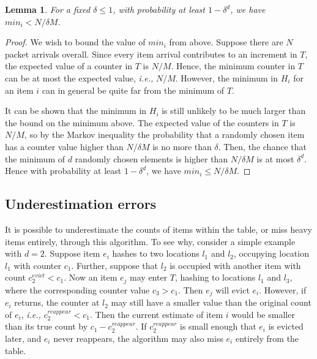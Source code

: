 \documentclass[10pt]{article}
\newtheorem{lemma}{Lemma}
\newcommand{\ie}{{\em i.e.,} }
\begin{document}
\begin{lemma}
For a fixed $\delta \leq 1$, with probability at least $1 - \delta^d$, we have
$min_i < N/\delta M$.
\end{lemma}

\begin{proof}

We wish to bound the value of $min_i$ from above. Suppose there are $N$ packet
arrivals overall. Since every item arrival contributes to an increment in $T$,
the expected value of a counter in $T$ is $N/M.$ Hence, the minimum counter in
$T$ can be at most the expected value, \ie $N/M.$ However, the minimum in $H_i$ for an
item $i$ can in general be quite far from the minimum of $T$.

It can be shown that the minimum in $H_i$ is still unlikely to be much larger
than the bound on the minimum above. The expected value of the counters in $T$
is $N/M$, so by the Markov inequality the probability that a randomly chosen
item has a counter value higher than $N/\delta M$ is no more than
$\delta$. Then, the chance that the minimum of $d$ randomly chosen elements is
higher than $N/\delta M$ is at most $\delta^d$. Hence with probability at least
$1 - \delta^d$, we have $min_i \leq N/\delta M$.

\end{proof}

\subsection{Underestimation errors}

It is possible to underestimate the counts of items within the table, or miss
heavy items entirely, through this algorithm. To see why, consider a simple
example with $d=2$. Suppose item $e_i$ hashes to two locations $l_1$ and $l_2$,
occupying location $l_1$ with counter $c_1$. Further, suppose that $l_2$ is
occupied with another item with count $c_2^{evict} < c_1$. Now an item $e_j$ may
enter $T$, hashing to locations $l_1$ and $l_3$, where the corresponding counter
value $c_3 > c_1$. Then $e_j$ will evict $e_i$. However, if $e_i$ returns, the
counter at $l_2$ may still have a smaller value than the original count of
$e_i$, \ie $c_2^{reappear} < c_1$. Then the current estimate of item $i$ would
be smaller than its true count by $c_1 - c_2^{reappear}$. If $c_2^{reappear}$ is
small enough that $e_i$ is evicted later, and $e_i$ never reappears, the
algorithm may also miss $e_i$ entirely from the table.
\end{document}
